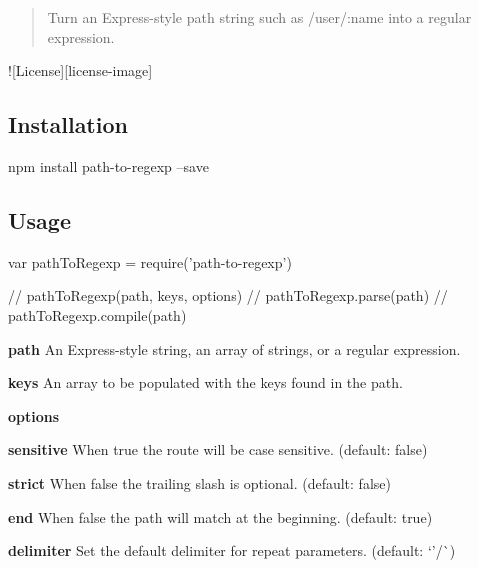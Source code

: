 \begin{quote}
Turn an Express-\/style path string such as {\ttfamily /user/\+:name} into a regular expression. \end{quote}


\href{https://npmjs.org/package/path-to-regexp}{\tt } \href{https://travis-ci.org/pillarjs/path-to-regexp}{\tt } \href{https://coveralls.io/r/pillarjs/path-to-regexp?branch=master}{\tt } \href{https://david-dm.org/pillarjs/path-to-regexp}{\tt } !\mbox{[}License\mbox{]}\mbox{[}license-\/image\mbox{]} \href{https://npmjs.org/package/path-to-regexp}{\tt }

\subsection*{Installation}


\begin{DoxyCode}
npm install path-to-regexp --save
\end{DoxyCode}


\subsection*{Usage}


\begin{DoxyCode}
var pathToRegexp = require('path-to-regexp')

// pathToRegexp(path, keys, options)
// pathToRegexp.parse(path)
// pathToRegexp.compile(path)
\end{DoxyCode}



\begin{DoxyItemize}
\item {\bfseries path} An Express-\/style string, an array of strings, or a regular expression.
\item {\bfseries keys} An array to be populated with the keys found in the path.
\item {\bfseries options}
\begin{DoxyItemize}
\item {\bfseries sensitive} When {\ttfamily true} the route will be case sensitive. (default\+: {\ttfamily false})
\item {\bfseries strict} When {\ttfamily false} the trailing slash is optional. (default\+: {\ttfamily false})
\item {\bfseries end} When {\ttfamily false} the path will match at the beginning. (default\+: {\ttfamily true})
\item {\bfseries delimiter} Set the default delimiter for repeat parameters. (default\+: `'/\textquotesingle{}\`{})
\end{DoxyItemize}
\end{DoxyItemize}


